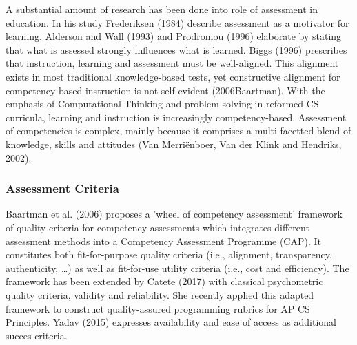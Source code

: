 A substantial amount of research has been done into role of assessment in education. In his study Frederiksen (1984) describe assessment as a motivator for learning. Alderson and Wall (1993) and Prodromou (1996) elaborate by stating that what is assessed strongly influences what is learned. Biggs (1996) prescribes that instruction, learning and assessment must be well-aligned. This alignment exists in most traditional knowledge-based tests, yet constructive alignment for competency-based instruction is not self-evident (2006Baartman). With the emphasis of Computational Thinking and problem solving in reformed CS curricula, learning and instruction is increasingly competency-based. Assessment of competencies is complex, mainly because it comprises a multi-facetted blend of knowledge, skills and attitudes (Van Merriënboer, Van der Klink and Hendriks, 2002).

\subsubsection*{Assessment Criteria}\label{sec:qualityCriteria}
Baartman et al. (2006) proposes a 'wheel of competency assessment' framework of quality criteria for competency assessments which integrates different assessment methods into a Competency Assessment Programme (CAP). It constitutes both fit-for-purpose quality criteria (i.e., alignment, transparency, authenticity, \ldots) as well as fit-for-use utility criteria (i.e., cost and efficiency). The framework has been extended by Catete (2017) with classical psychometric quality criteria, validity and reliability. She recently applied this adapted framework to construct quality-assured programming rubrics for AP CS Principles. Yadav (2015) expresses availability and ease of access as additional succes criteria.




